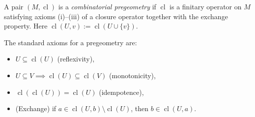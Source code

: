 A pair $(M, \operatorname{cl})$ is a \emph{combinatorial pregeometry} if $\operatorname{cl}$ is a finitary operator on $M$ satisfying axioms (i)--(iii) of a closure operator together with the exchange property. Here $\operatorname{cl}(U, v) := \operatorname{cl}(U \cup \{v\})$.

The standard axioms for a pregeometry are:
\begin{itemize}
\item[(i)] $U \subseteq \operatorname{cl}(U)$ (reflexivity),
\item[(ii)] $U \subseteq V \implies \operatorname{cl}(U) \subseteq \operatorname{cl}(V)$ (monotonicity),
\item[(iii)] $\operatorname{cl}(\operatorname{cl}(U)) = \operatorname{cl}(U)$ (idempotence),
\item[(iv)] (Exchange) if $a \in \operatorname{cl}(U, b) \setminus \operatorname{cl}(U)$, then $b \in \operatorname{cl}(U, a)$.
\end{itemize}
